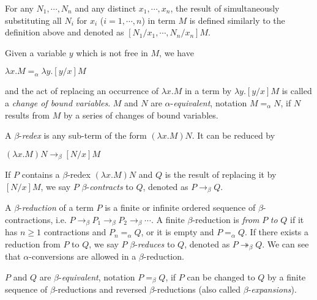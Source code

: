 For any $ N_1, \cdots , N_n $ and any distinct $ x_1, \cdots , x_n $, the result of simultaneously substituting all $ N_i $ for $ x_i $ ($ i = 1, \cdots , n $) in term $ M $ is defined similarly to the definition above and denoted as $ [N_1/x_1, \cdots , N_n/x_n]M $.
\mbox\\
\begin{definition}
\label{definition:alpha}
Given a variable $ y $ which is not free in $ M $, we have
\begin{center}
$ \lambda x.M =_\alpha \lambda y.[y/x]M $
\end{center}
and the act of replacing an occurrence of $ \lambda x.M $ in a term by $ \lambda y.[y/x]M $ is called a \emph{change of bound variables}. $ M $ and $ N $ are $ \alpha $-\emph{equivalent}, notation $ M =_\alpha N $, if $ N $ results from $ M $ by a series of changes of bound variables.
\end{definition}

\begin{definition}
\label{definition:beta}
\mbox\\
\begin{myitemize}
\item A $ \beta $-\emph{redex} is any sub-term of the form $ (\lambda x.M)N $. It can be reduced by
\begin{center}
$ (\lambda x.M)N  \to _\beta [N/x]M $
\end{center}
If $ P $ contains a $ \beta $-redex $ (\lambda x.M)N $ and $ Q $ is the result of replacing it by $ [N/x]M $, we say $ P $ $ \beta $-\emph{contracts} to $ Q $, denoted as $ P \to _\beta Q $.
\item A $ \beta $-\emph{reduction} of a term $ P $ is a finite or infinite ordered sequence of $ \beta $-contractions, i.e. $ P \to _\beta P_1 \to _\beta P_2 \to _\beta \cdots $. A finite $ \beta $-reduction is \emph{from} $ P $ \emph{to} $ Q $ if it has $ n \geq 1 $ contractions and $ P_n = _\alpha Q $, or it is empty and $ P = _\alpha Q $. If there exists a reduction from $ P $ to $ Q $, we say $ P $ $ \beta $-\emph{reduces} to $ Q $, denoted as $ P \twoheadrightarrow _\beta Q $. We can see that $ \alpha $-conversions are allowed in a $ \beta $-reduction.
\item $ P $ and $ Q $ are $ \beta $-\emph{equivalent}, notation $ P =_\beta Q $, if $ P $ can be changed to $ Q $ by a finite sequence of $ \beta $-reductions and reversed $ \beta $-reductions (also called $ \beta $-\emph{expansions}).
\end{myitemize}
\end{definition}

